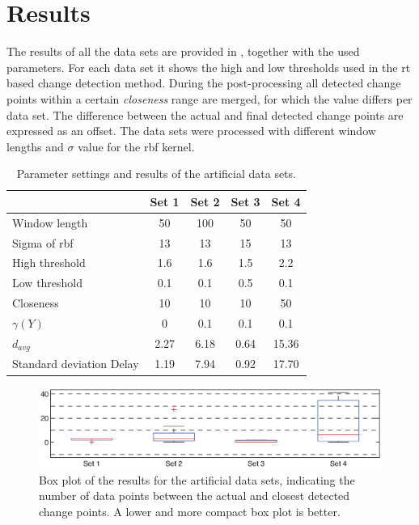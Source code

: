 \section{Results}\label{sec:artificial_data_results}
The results of all the data sets are provided in , together with the used parameters.
For each data set it shows the high and low thresholds used in the \gls{rt} based change detection method.
During the post-processing all detected change points within a certain \emph{closeness} range are merged, for which the value differs per data set.
The difference between the actual and final detected change points are expressed as an offset.
The data sets were processed with different window lengths and $\sigma$ value for the \gls{rbf} kernel.

\begin{table}
  \centering
  \caption[Results artificial data sets]{Parameter settings and results of the artificial data sets.}
  \begin{tabulary}{\textwidth}{|l|c|c|c|c|}
     & Set 1 & Set 2 & Set 3 & Set 4 \\
    \hline
    Window length & 50 & 100 & 50 & 50 \\
    \hline
    Sigma of \gls{rbf} & 13 & 13 & 15 & 13 \\
    \hline
    High threshold & 1.6 & 1.6 & 1.5 & 2.2 \\
    \hline
    Low threshold & 0.1 & 0.1 & 0.5 & 0.1 \\
    \hline
    Closeness & 10 & 10 & 10 & 50 \\
    \hline
    \hline
    $\gamma(Y)$ & 0 & 0.1 & 0.1 & 0.1 \\
    \hline
    $d_{avg}$ & 2.27 & 6.18 & 0.64 & 15.36 \\
    \hline
    Standard deviation Delay & 1.19 & 7.94 & 0.92 & 17.70 \\
    \hline
  \end{tabulary}
  \label{tab:results_artificial}
\end{table}

\begin{figure}
\centering
  \includegraphics[width=1\textwidth]{./Figures/chapter5/boxplot_results_artificial_sets.eps}
  \caption[Box plot results artificial data sets]{Box plot of the results for the artificial data sets, indicating the number of data points between the actual and closest detected change points. A lower and more compact box plot is better.}
  \label{fig:boxplot_artificial_sets}
\end{figure}

